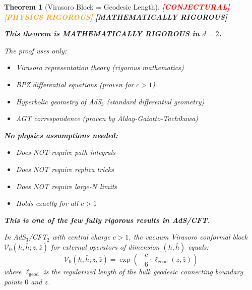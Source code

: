 \documentclass[12pt,a4paper]{article}
\newtheorem{theorem}{Theorem}[section]
\newcommand{\rigormark}[1]{%
  \ifcase#1
    \textcolor{red}{\textbf{[CONJECTURAL]}}%
  \or
    \textcolor{orange}{\textbf{[PHYSICS-RIGOROUS]}}%
  \or
    \textcolor{green!50!black}{\textbf{[MATHEMATICALLY RIGOROUS]}}%
  \fi
}
\begin{document}
\begin{theorem}[Virasoro Block = Geodesic Length]\label{thm:virasoro-geodesic}
\rigormark{2} %

\begin{rigorbox}
\textbf{This theorem is MATHEMATICALLY RIGOROUS in $d=2$.}

The proof uses only:
\begin{itemize}
    \item Virasoro representation theory (rigorous mathematics)
    \item BPZ differential equations (proven for $c > 1$)
    \item Hyperbolic geometry of AdS$_3$ (standard differential geometry)
    \item AGT correspondence (proven by Alday-Gaiotto-Tachikawa)
\end{itemize}

\textbf{No physics assumptions needed:}
\begin{itemize}
    \item Does NOT require path integrals
    \item Does NOT require replica tricks  
    \item Does NOT require large-$N$ limits
    \item Holds \emph{exactly} for all $c > 1$
\end{itemize}

\textbf{This is one of the few fully rigorous results in AdS/CFT.}
\end{rigorbox}

In AdS$_3$/CFT$_2$ with central charge $c > 1$, the vacuum Virasoro conformal block $\mathcal{V}_0(h, \bar{h}; z, \bar{z})$ for external operators of dimension $(h, \bar{h})$ equals:
\begin{equation}
\mathcal{V}_0(h, \bar{h}; z, \bar{z}) = \exp\left( -\frac{c}{6} \cdot \ell_{\text{geod}}(z, \bar{z}) \right)
\end{equation}
where $\ell_{\text{geod}}$ is the regularized length of the bulk geodesic connecting boundary points $0$ and $z$.
\end{theorem}
\end{document}
